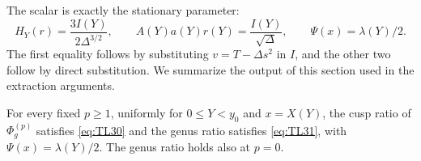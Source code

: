 The scalar is exactly the stationary parameter: \begin{equation}
H_Y(r)=\frac{3I(Y)}{2\Delta^{3/2}},\qquad
 A(Y)a(Y)r(Y)=\frac{I(Y)}{\sqrt\Delta},\qquad
 \Psi(x)=\lambda(Y)/2.
 \label{eq:TL32}
\end{equation} The first equality follows by substituting \(v=T-\Delta s^2\) in
\(I\), and the other two follow by direct substitution. We summarize the
output of this section used in the extraction arguments.

\begin{proposition}\label{prop:marked-ratios}
For every fixed \(p\ge1\), uniformly for \(0\le Y<y_0\) and \(x=X(Y)\), the
cusp ratio of \(\Phi_g^{(p)}\) satisfies \eqref{eq:TL30} and the genus ratio
satisfies \eqref{eq:TL31}, with \(\Psi(x)=\lambda(Y)/2\). The genus ratio
holds also at \(p=0\).
\end{proposition}
